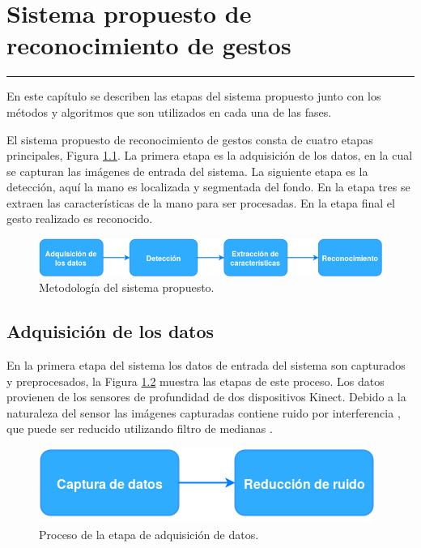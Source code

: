 \chapter{Sistema propuesto de reconocimiento de gestos}\label{capit:cap3}
\vspace{-2.0325ex}%
\noindent
\rule{\textwidth}{0.5pt}
\vspace{-5.5ex}%
\newcommand{\pushline}{\Indp}%

En este cap\'itulo se describen las etapas del sistema propuesto junto con los métodos y algoritmos que son utilizados en cada una de las fases.
 
El sistema propuesto de reconocimiento de gestos consta de cuatro etapas principales, Figura \ref{fig:MyHGR}. La primera etapa es la adquisición de los datos, en la cual se capturan las imágenes de entrada del sistema. La siguiente etapa es la detección, aquí la mano es localizada y segmentada del fondo. En la etapa tres se extraen las características de la mano para ser procesadas. En la etapa final el gesto realizado es reconocido.   

\begin{figure}[h!]
\begin{center}
\includegraphics[scale=.6]{./Figures/MyHGR.png}
\end{center}
\caption{Metodología del sistema propuesto.}
\label{fig:MyHGR}
\end{figure}  
  
\section{Adquisición de los datos}\label{sec:KinectSensor} 

En la primera etapa del sistema los datos de entrada del sistema son capturados y preprocesados, la Figura \ref{fig:Dadquisicion} muestra las etapas de este proceso. Los datos provienen de los sensores de profundidad de dos dispositivos Kinect. Debido a la naturaleza del sensor las imágenes capturadas contiene ruido por interferencia \citep{Mallick2014}, que puede ser reducido utilizando filtro de medianas \citep{Maimone2011}.

\begin{figure}[h!]
\begin{center}
\includegraphics[scale=.6]{./Figures/Adquisicion.png}
\end{center}
\caption{Proceso de la etapa de adquisición de datos.} 
\label{fig:Dadquisicion}
\end{figure}   


